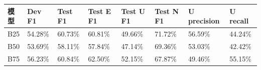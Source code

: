 \begin{tabular}{llllllll}
\toprule
模型 & Dev F1 & Test F1 & Test E F1 & Test U F1 & Test N F1 & U precision & U recall\\
\midrule
B25 & 54.28\% & 60.73\% & 60.81\% & 49.66\% & 71.72\% & 56.59\% & 44.24\%\\
B50 & 53.69\% & 58.11\% & 57.84\% & 47.14\% & 69.36\% & 53.03\% & 42.42\%\\
B75 & 56.23\% & 60.84\% & 62.50\% & 52.15\% & 67.87\% & 49.46\% & 55.15\%\\
\bottomrule
\end{tabular}

